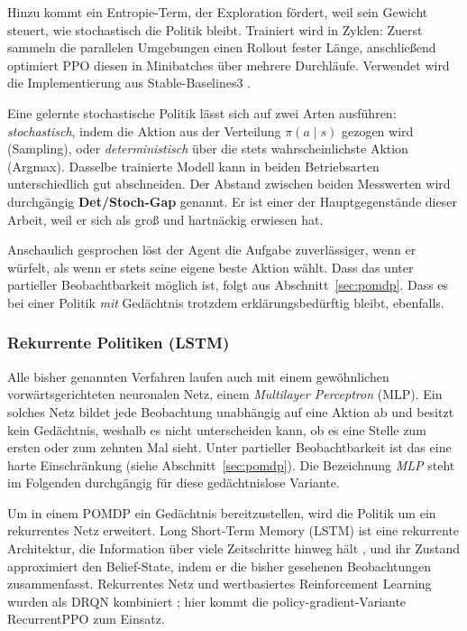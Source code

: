 \documentclass[11pt,a4paper]{article}
\begin{document}
Hinzu kommt ein Entropie-Term, der Exploration fördert, weil sein Gewicht
steuert, wie stochastisch die Politik bleibt. Trainiert wird in Zyklen: Zuerst
sammeln die parallelen Umgebungen einen Rollout fester Länge, anschließend
optimiert PPO diesen in Minibatches über mehrere Durchläufe. Verwendet wird die
Implementierung aus Stable-Baselines3 \cite{raffin2021stable}.

Eine gelernte stochastische Politik lässt sich auf zwei Arten ausführen:
\emph{stochastisch}, indem die Aktion aus der Verteilung $\pi(a\mid s)$ gezogen
wird (Sampling), oder \emph{deterministisch} über die stets wahrscheinlichste
Aktion (Argmax). Dasselbe trainierte Modell kann in beiden Betriebsarten
unterschiedlich gut abschneiden. Der Abstand zwischen beiden Messwerten wird
durchgängig \textbf{Det/Stoch-Gap} genannt. Er ist einer der Hauptgegenstände
dieser Arbeit, weil er sich als groß und hartnäckig erwiesen hat.

Anschaulich gesprochen löst der Agent die Aufgabe zuverlässiger, wenn er
würfelt, als wenn er stets seine eigene beste Aktion wählt. Dass das unter
partieller Beobachtbarkeit möglich ist, folgt aus Abschnitt~\ref{sec:pomdp}.
Dass es bei einer Politik \emph{mit} Gedächtnis trotzdem erklärungsbedürftig
bleibt, ebenfalls.

\subsubsection{Rekurrente Politiken (LSTM)}
\label{sec:lstm}

Alle bisher genannten Verfahren laufen auch mit einem gewöhnlichen
vorwärtsgerichteten neuronalen Netz, einem \emph{Multilayer Perceptron}
(MLP). Ein solches Netz bildet jede Beobachtung unabhängig auf eine Aktion ab
und besitzt kein Gedächtnis, weshalb es nicht unterscheiden kann, ob es eine
Stelle zum ersten oder zum zehnten Mal sieht. Unter partieller Beobachtbarkeit
ist das eine harte Einschränkung (siehe Abschnitt~\ref{sec:pomdp}). Die
Bezeichnung \emph{MLP} steht im Folgenden durchgängig für diese gedächtnislose
Variante.

Um in einem POMDP ein Gedächtnis bereitzustellen, wird die Politik um ein
rekurrentes Netz erweitert. Long Short-Term Memory (LSTM) ist eine rekurrente
Architektur, die Information über viele Zeitschritte hinweg hält
\cite{hochreiter1997lstm}, und ihr Zustand approximiert den Belief-State, indem
er die bisher gesehenen Beobachtungen zusammenfasst. Rekurrentes Netz und
wertbasiertes Reinforcement Learning wurden als DRQN kombiniert
\cite{hausknecht2015drqn}; hier kommt die policy-gradient-Variante
RecurrentPPO zum Einsatz.
\end{document}
